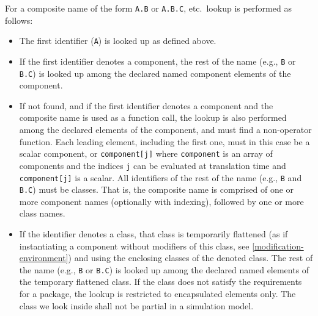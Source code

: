 For a composite name of the form \lstinline!A.B! or \lstinline!A.B.C!, etc.\ lookup is performed as follows:
\begin{itemize}
\item
  The first identifier (\lstinline!A!) is looked up as defined above.
\item
  If the first identifier denotes a component, the rest of the name (e.g., \lstinline!B! or \lstinline!B.C!) is looked up among the declared named component elements of the component.
\item
  If not found, and if the first identifier denotes a component and the composite name is used as a function call, the lookup is also performed among the declared elements of the component, and must find a non-operator function.
  Each leading element, including the first one, must in this case be a scalar component, or \lstinline!component[j]! where \lstinline!component! is an array of components and the indices \lstinline!j! can be evaluated at translation time and \lstinline!component[j]! is a scalar.
  All identifiers of the rest of the name (e.g., \lstinline!B! and \lstinline!B.C!) must be classes.
  That is, the composite name is comprised of one or more component names (optionally with indexing), followed by one or more class names.
\item
  If the identifier denotes a class, that class is temporarily flattened (as if instantiating a component without modifiers of this class, see \cref{modification-environment}) and using the enclosing classes of the denoted class.
  The rest of the name (e.g., \lstinline!B! or \lstinline!B.C!) is looked up among the declared named elements of the temporary flattened class.
  If the class does not satisfy the requirements for a package, the lookup is restricted to encapsulated elements only.
  The class we look inside shall not be partial in a simulation model.
\end{itemize}

